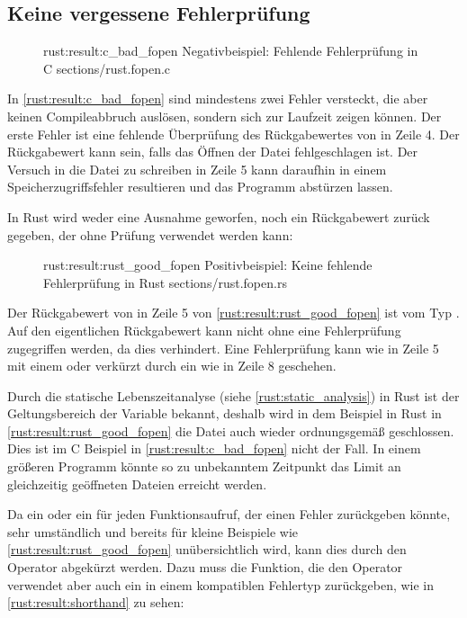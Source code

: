 \subsection{Keine vergessene Fehlerprüfung}
\label{rust:result}

\begin{figure}[H]
	\ccinclude
	{rust:result:c_bad_fopen}
	{Negativbeispiel: Fehlende Fehlerprüfung in C}
	{sections/rust.fopen.c}
\end{figure}

In \autoref{rust:result:c_bad_fopen} sind mindestens zwei Fehler versteckt, die aber keinen Compileabbruch auslösen, sondern sich zur Laufzeit zeigen können.
Der erste Fehler ist eine fehlende Überprüfung des Rückgabewertes von  in Zeile 4.
Der Rückgabewert kann  sein, falls das Öffnen der Datei fehlgeschlagen ist.
Der Versuch in die Datei zu schreiben in Zeile 5 kann daraufhin in einem Speicherzugriffsfehler resultieren und das Programm abstürzen lassen.

In Rust wird weder eine Ausnahme geworfen, noch ein Rückgabewert zurück gegeben, der ohne Prüfung verwendet werden kann:

\begin{figure}[H]
	\rustcinclude
		{rust:result:rust_good_fopen}
		{Positivbeispiel: Keine fehlende Fehlerprüfung in Rust}
		{sections/rust.fopen.rs}
\end{figure}

Der Rückgabewert von  in Zeile 5 von \autoref{rust:result:rust_good_fopen} ist vom Typ .
Auf den eigentlichen Rückgabewert  kann nicht ohne eine Fehlerprüfung zugegriffen werden, da dies  verhindert.
Eine Fehlerprüfung kann wie in Zeile 5 mit einem  oder verkürzt durch ein  wie in Zeile 8 geschehen.

Durch die statische Lebenszeitanalyse (siehe \autoref{rust:static_analysis}) in Rust ist der Geltungsbereich der  Variable bekannt, deshalb wird in dem Beispiel in Rust in \autoref{rust:result:rust_good_fopen} die Datei auch wieder ordnungsgemäß geschlossen.
Dies ist im C Beispiel in \autoref{rust:result:c_bad_fopen} nicht der Fall.
In einem größeren Programm könnte so zu unbekanntem Zeitpunkt das Limit an gleichzeitig geöffneten Dateien erreicht werden.

Da ein  oder ein  für jeden Funktionsaufruf, der einen Fehler zurückgeben könnte, sehr umständlich und bereits für kleine Beispiele wie \autoref{rust:result:rust_good_fopen} unübersichtlich wird, kann dies durch den Operator  abgekürzt werden.
Dazu muss die Funktion, die den Operator verwendet aber auch ein  in einem kompatiblen Fehlertyp zurückgeben, wie in \autoref{rust:result:shorthand} zu sehen:

